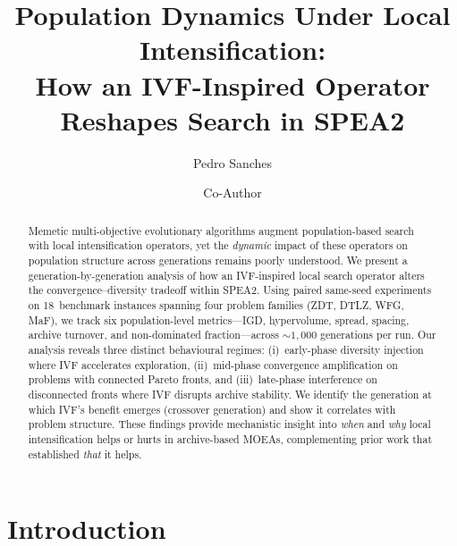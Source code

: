 \documentclass[runningheads]{llncs}
\begin{document}
\title{Population Dynamics Under Local Intensification:\\
  How an IVF-Inspired Operator Reshapes Search in SPEA2}


\author{Pedro Sanches
\and Co-Author}



\maketitle

\begin{abstract}
Memetic multi-objective evolutionary algorithms augment population-based
search with local intensification operators, yet the \emph{dynamic}
impact of these operators on population structure across generations
remains poorly understood. We present a generation-by-generation
analysis of how an IVF-inspired local search operator alters the
convergence--diversity tradeoff within SPEA2. Using paired same-seed
experiments on 18~benchmark instances spanning four problem families
(ZDT, DTLZ, WFG, MaF), we track six population-level metrics---IGD,
hypervolume, spread, spacing, archive turnover, and non-dominated
fraction---across ${\sim}1{,}000$ generations per run. Our analysis
reveals three distinct behavioural regimes: (i)~early-phase diversity
injection where IVF accelerates exploration, (ii)~mid-phase convergence
amplification on problems with connected Pareto fronts, and
(iii)~late-phase interference on disconnected fronts where IVF disrupts
archive stability. We identify the generation at which IVF's benefit
emerges (crossover generation) and show it correlates with problem
structure. These findings provide mechanistic insight into \emph{when}
and \emph{why} local intensification helps or hurts in archive-based
MOEAs, complementing prior work that established \emph{that} it helps.

\end{abstract}

\section{Introduction}
\label{sec:intro}
\end{document}

